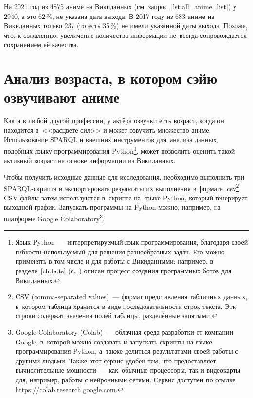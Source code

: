 На 2021 год из \num{4875} аниме на Викиданных (см. запрос~\ref{lst:all_anime_list}) 
у \num{2940}, а это 62\,\%, не указана дата выхода. 
В 2017 году из 683 аниме на Викиданных только 237 (то есть 35\,\%) не имели указанной даты выхода. 
Похоже, что, к сожалению, увеличение количества информации 
не~всегда сопровождается сохранением её качества.%





\section{Анализ возраста, в котором сэйю озвучивают аниме}

Как и в любой другой профессии, у актёра озвучки есть возраст, 
когда он находится в~<<расцвете сил>> и может озвучить множество аниме. 
Использование SPARQL и внешних инструментов для~анализа данных, 
подобных языку программирования Python\footnote[][-1cm]{%
    Язык Python~--- интерпретируемый язык программирования, 
    благодаря своей гибкости используемый для решения разнообразных задач. 
    Его можно применять в том числе и для работы с Викиданными: 
    например, в разделе~\ref{ch:bots} (с.~\pageref{ch:bots}) 
    описан процесс создания программных ботов для Викиданных.%
%
}, может позволить оценить такой активный возраст на основе информации из Викиданных.


Чтобы получить исходные данные для исследования, необходимо выполнить три SPARQL-скрипта 
и экспортировать результаты их выполнения в формате .csv\footnote[][-0.3cm]{%
%
    CSV (comma-separated values)~--- формат представления табличных данных, 
    в~котором таблица хранится в виде последовательности строк текста. 
    Эти строки содержат значения полей таблицы, разделённые запятыми.%
%
}.\, CSV-файлы затем используются в~скрипте на~языке Python, 
который генерирует выходной график. 
Запускать программы на Python можно, например, 
на платформе Google Colaboratory\footnote[][0.2cm]{%
%
    Google Colaboratory (Colab)~--- облачная среда разработки от компании Google, 
    в~которой можно создавать и запускать скрипты на языке программирования Python, 
    а~также делиться результатами своей работы с другими людьми. 
    \mbox{Также} этот сервис удобен тем, что предоставляет вычислительные мощности~--- 
    как~обычные процессоры, так и видеокарты для, например, работы с нейронными сетями. 
    Сервис доступен по ссылке: \href{https://colab.research.google.com}{https://colab.research.google.com}.%
}.



